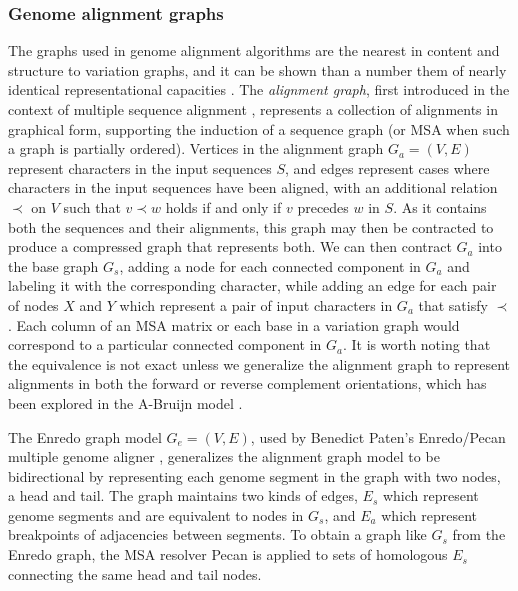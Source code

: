 \documentclass[a4paper,12pt,numbered,oneside]{Classes/PhDThesisPSnPDF}
\begin{document}
\subsubsection{Genome alignment graphs}
\label{sec:genome_alignment_graphs}
The graphs used in genome alignment algorithms are the nearest in content and structure to variation graphs, and it can be shown than a number them of nearly identical representational capacities \cite{kehr2014genome}.
The \emph{alignment graph}, first introduced in the context of multiple sequence alignment \cite{kececioglu1993maximum,rausch2008segment}, represents a collection of alignments in graphical form, supporting the induction of a sequence graph (or MSA when such a graph is partially ordered).
Vertices in the alignment graph $G_a = (V, E)$ represent characters in the input sequences $S$, and edges represent cases where characters in the input sequences have been aligned, with an additional relation $\prec$ on $V$ such that $v \prec w$ holds if and only if $v$ precedes $w$ in $S$.
As it contains both the sequences and their alignments, this graph may then be contracted to produce a compressed graph that represents both.
We can then contract $G_a$ into the base graph $G_s$, adding a node for each connected component in $G_a$ and labeling it with the corresponding character, while adding an edge for each pair of nodes $X$ and $Y$ which represent a pair of input characters in $G_a$ that satisfy $\prec$.
Each column of an MSA matrix or each base in a variation graph would correspond to a particular connected component in $G_a$.
It is worth noting that the equivalence is not exact unless we generalize the alignment graph to represent alignments in both the forward or reverse complement orientations, which has been explored in the A-Bruijn model \cite{raphael2004novel}.

The Enredo graph model $G_e = (V, E)$, used by Benedict Paten's Enredo/Pecan multiple genome aligner \cite{paten2008enredo}, generalizes the alignment graph model to be bidirectional by representing each genome segment in the graph with two nodes, a head and tail.
The graph maintains two kinds of edges, $E_s$ which represent genome segments and are equivalent to nodes in $G_s$, and $E_a$ which represent breakpoints of adjacencies between segments.
To obtain a graph like $G_s$ from the Enredo graph, the MSA resolver Pecan is applied to sets of homologous $E_s$ connecting the same head and tail nodes.
\end{document}
